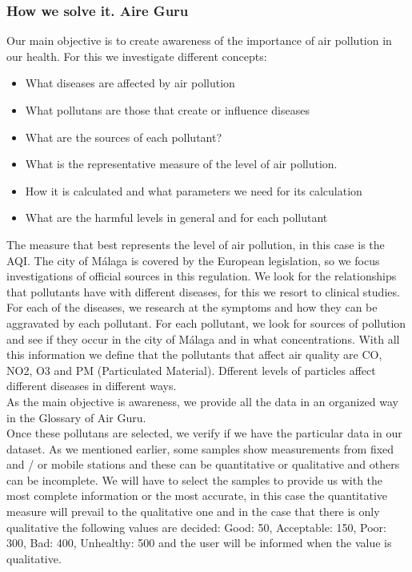 \subsubsection{How we solve it. Aire Guru} 
Our main objective is to create awareness of the importance of air pollution in our health. For this we investigate different concepts:
\begin{itemize}
    \item What diseases are affected by air pollution
    \item What pollutans are those that create or influence diseases
    \item What are the sources of each pollutant?
    \item What is the representative measure of the level of air pollution.
    \item How it is calculated and what parameters we need for its calculation
    \item What are the harmful levels in general and for each pollutant
\end{itemize}
The measure that best represents the level of air pollution, in this case is the AQI. The city of Málaga is covered by the European legislation, 
so we focus investigations of official sources in this regulation.
We look for the relationships that pollutants have with different diseases, for this we resort to clinical studies. For each of the diseases, we 
research at the symptoms and how they can be aggravated by each pollutant.
For each pollutant, we look for sources of pollution and see if they occur in the city of Málaga and in what concentrations.
With all this information we define that the pollutants that affect air quality are CO, NO2, O3 and PM (Particulated Material). Dfferent levels of particles
affect different diseases in different ways. \\

As the main objective is awareness, we provide all the data in an organized way in the Glossary of Air Guru. \\

Once these pollutans are selected, we verify if we have the particular data in our dataset. As we mentioned earlier, some samples show measurements 
from fixed and / or mobile stations and these can be quantitative or qualitative and others can be incomplete. We will have to select the
samples to provide us with the most complete information or the most accurate, in this case the quantitative measure will prevail to the qualitative 
one and in the case that there is only qualitative
the following values are decided: Good: 50, Acceptable: 150, Poor: 300, Bad: 400, Unhealthy: 500 and the user will be informed when the value is qualitative. \\


